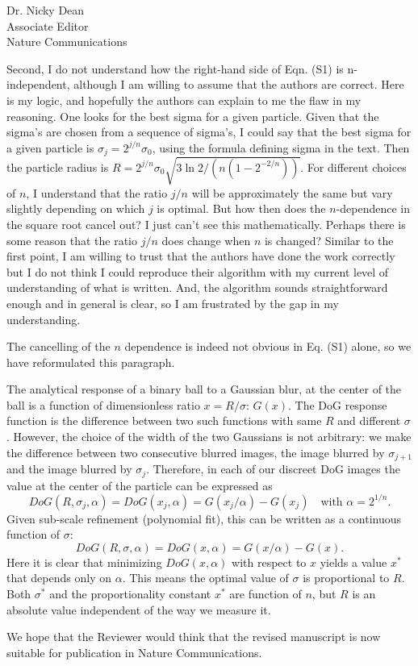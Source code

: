 \documentclass[a4paper, rebuttal, parskip=true, firsthead=false, fromemail=true, foldmarks=false]{scrlttr2}
\begin{document}
\begin{letter}{Dr. Nicky Dean\\
Associate Editor\\
Nature Communications}
\begin{quotationi}
Second, I do not understand how the right-hand side of Eqn. (S1) is n-independent, although I am willing to assume that the authors are correct. Here is my logic, and hopefully the authors can explain to me the flaw in my reasoning. One looks for the best sigma for a given particle. Given that the sigma's are chosen from a sequence of sigma's, I could say that the best sigma for a given particle is $\sigma_j = 2^{j/n} \sigma_0$, using the formula defining sigma in the text. Then the particle radius is $R = 2^{j/n} \sigma_0 \sqrt{3 \ln 2 / (n (1-2^{-2/n}))}$. For different choices of $n$, I understand that the ratio $j/n$ will be approximately the same but vary slightly depending on which $j$ is optimal. But how then does the $n$-dependence in the square root cancel out? I just can't see this mathematically. Perhaps there is some reason that the ratio $j/n$ does change when $n$ is changed? Similar to the first point, I am willing to trust that the authors have done the work correctly but I do not think I could reproduce their algorithm with my current level of understanding of what is written. And, the algorithm sounds straightforward enough and in general is clear, so I am frustrated by the gap in my understanding.
\end{quotationi}

The cancelling of the $n$ dependence is indeed not obvious in Eq. (S1) alone, so we have reformulated this paragraph.


The analytical response of a binary ball to a Gaussian blur, at the center of the ball is a function of dimensionless ratio $x=R/\sigma$: $G(x)$. The DoG response function is the difference between two such functions with same $R$ and different $\sigma$. However, the choice of the width of the two Gaussians is not arbitrary: we make the difference between two consecutive blurred images, the image blurred by $\sigma_{j+1}$ and the image blurred by $\sigma_j$. Therefore, in each of our discreet DoG images the value at the center of the particle can be expressed as
\[
DoG(R,\sigma_j, \alpha) = DoG(x_j, \alpha) = G(x_j/\alpha) - G(x_j) \quad\text{with }\alpha=2^{1/n}.
\]
Given sub-scale refinement (polynomial fit), this can be written as a continuous function of $\sigma$:
\[
DoG(R,\sigma, \alpha) = DoG(x, \alpha) = G(x/\alpha) - G(x).
\]
Here it is clear that minimizing $DoG(x, \alpha)$ with respect to $x$ yields a value $x^*$ that depends only on $\alpha$. This means the optimal value of $\sigma$ is proportional to $R$.  Both $\sigma^*$ and the proportionality constant $x^*$ are function of $n$, but $R$ is an absolute value independent of the way we measure it.

We hope that the Reviewer would think that the revised manuscript is now suitable for publication in Nature Communications. 


\end{letter} 
\end{document}
